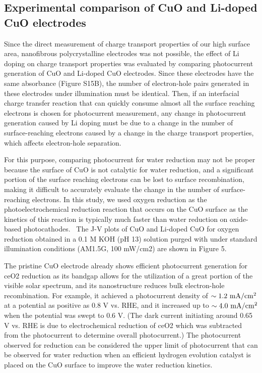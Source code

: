 \subsection{Experimental comparison of CuO and Li-doped CuO electrodes}
Since the direct measurement of charge transport properties of our high surface area, nanofibrous polycrystalline electrodes was not possible, the effect of Li doping on charge transport properties was evaluated by comparing photocurrent generation of CuO and Li-doped CuO electrodes.  Since these electrodes have the same absorbance (Figure S15B), the number of electron-hole pairs generated in these electrodes under illumination must be identical.  Then, if an interfacial charge transfer reaction that can quickly consume almost all the surface reaching electrons is chosen for photocurrent measurement, any change in photocurrent generation caused by Li doping must be due to a change in the number of surface-reaching electrons caused by a change in the charge transport properties, which affects electron-hole separation.

For this purpose, comparing photocurrent for water reduction may not be proper because the surface of CuO is not catalytic for water reduction, and a significant portion of the surface reaching electrons can be lost to surface recombination, making it difficult to accurately evaluate the change in the number of surface-reaching electrons. In this study, we used oxygen reduction as the photoelectrochemical reduction reaction that occurs on the CuO surface as the kinetics of this reaction is typically much faster than water reduction on oxide-based photocathodes.~\cite{cardiel2017electrochemical,kang2016photoelectrochemical,read2012electrochemical,wheeler2017photoelectrochemical} The J-V plots of CuO and Li-doped CuO for oxygen reduction obtained in a 0.1 M KOH (pH 13) solution purged with  under standard illumination conditions (AM1.5G, 100 mW/cm2) are shown in Figure 5.

The pristine CuO electrode already shows efficient photocurrent generation for ce{O2} reduction as its bandgap allows for the utilization of a great portion of the visible solar spectrum, and its nanostructure reduces bulk electron-hole recombination.  For example, it achieved a photocurrent density of $\sim 1.2\ {\rm mA/cm^2}$ at a potential as positive as 0.8 V vs. RHE, and it increased up to $\sim 4.0\ {\rm mA/cm^2}$ when the potential was swept to 0.6 V. (The dark current initiating around 0.65 V vs. RHE is due to electrochemical reduction of ce{O2} which was subtracted from the photocurrent to determine overall photocurrent.) The photocurrent observed for  reduction can be considered the upper limit of photocurrent that can be observed for water reduction when an efficient hydrogen evolution catalyst is placed on the CuO surface to improve the water reduction kinetics.

